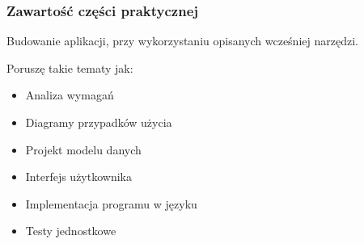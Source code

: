 \begin{frame}
\frametitle{Zawartość części praktycznej}
Budowanie aplikacji, przy wykorzystaniu opisanych wcześniej narzędzi.

Poruszę takie tematy jak:
\begin{itemize}
\item Analiza wymagań
\item Diagramy przypadków użycia
\item Projekt modelu danych
\item Interfejs użytkownika
\item Implementacja programu w języku \Csharp
\item Testy jednostkowe
\end{itemize}
\end{frame}
